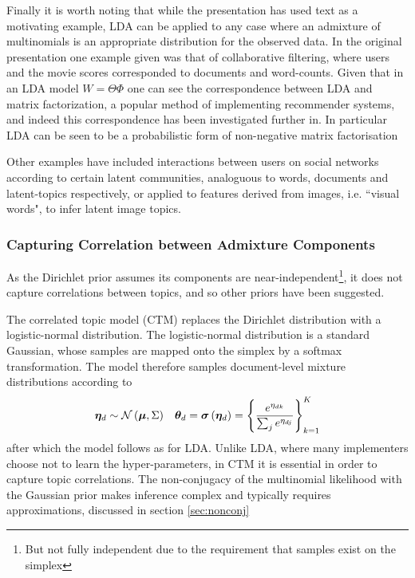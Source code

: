 Finally it is worth noting that while the presentation has used text as a motivating example, LDA can be applied to any case where an admixture of multinomials is an appropriate distribution for the observed data. In the original presentation\cite{BleiNgJordan2003} one example given was that of collaborative filtering, where users and the movie scores corresponded to documents and word-counts. Given that in an LDA model $W = \Theta \Phi$ one can see the correspondence between LDA and matrix factorization, a popular method of implementing recommender systems\cite{Salakhutdinov2007}, and indeed this correspondence has been investigated further in\cite{Agarwal2010}. In particular LDA can be seen to be a probabilistic form of non-negative matrix factorisation\cite{Lin2007}

Other examples have included interactions between users on social networks  according to certain latent communities, analoguous to words, documents and latent-topics respectively\cite{Zhang2007}, or applied to features derived from images, i.e. ``visual words", to infer latent image topics.\cite{Philbin2008}


\subsubsection{Capturing Correlation between Admixture Components}

As the Dirichlet prior assumes its components are near-independent\footnote{But not fully independent due to the requirement that samples exist on the simplex}, it does not capture correlations between topics, and so other priors have been suggested.

The correlated topic model\cite{Blei2006} (CTM) replaces the Dirichlet distribution with a logistic-normal distribution.  The logistic-normal distribution is a standard Gaussian, whose samples are mapped onto the simplex by a softmax transformation. The model therefore samples document-level mixture distributions according to
\begin{align}
\bm \eta_d & \sim \mathcal{N} \left( {\bm \mu}, {\Sigma} \right) & { \bm \theta_d } = \bm \sigma\left(\bm \eta_d\right) = \left\{\frac{e^{\eta_{dk}}}{\sum_j e^{\eta_{dj}}}\right\}_{k=1}^K
\end{align}
after which the model follows as for LDA. Unlike LDA, where many implementers choose not to learn the hyper-parameters, in CTM it is essential in order to capture topic correlations. The non-conjugacy of the multinomial likelihood with the Gaussian prior makes inference complex and typically requires approximations, discussed in section \ref{sec:nonconj}

